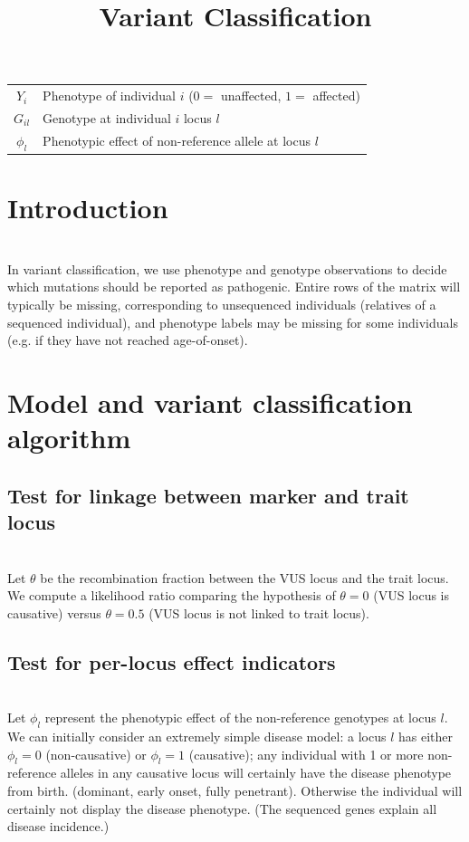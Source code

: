 \documentclass[11pt]{article}
\title{Variant Classification}
\newcommand{\p}{~\\}
\begin{document}
\maketitle

\begin{center}
  \begin{tabular}{c|l}
    $Y_i$     & Phenotype of individual $i$ ($0=$ unaffected, $1=$ affected)\\
    $G_{il}$   & Genotype at individual $i$ locus $l$\\
    $\phi_l$  & Phenotypic effect of non-reference allele at locus $l$\\
  \end{tabular}
\end{center}

\section{Introduction}

\p In variant classification, we use phenotype and genotype
observations to decide which mutations should be reported as
pathogenic. Entire rows of
the matrix will typically be missing, corresponding to unsequenced
individuals (relatives of a sequenced individual), and phenotype
labels may be missing for some individuals (e.g. if they have not
reached age-of-onset).


\section{Model and variant classification algorithm}

\subsection{Test for linkage between marker and trait locus}

\p Let $\theta$ be the recombination fraction between the VUS locus
and the trait locus. We compute a likelihood ratio comparing the
hypothesis of $\theta=0$ (VUS locus is causative) versus $\theta=0.5$
(VUS locus is not linked to trait locus).

\subsection{Test for per-locus effect indicators}

\p Let $\phi_l$ represent the phenotypic effect of the non-reference
genotypes at locus $l$. We can initially consider an extremely simple
disease model: a locus $l$ has either $\phi_l=0$ (non-causative) or
$\phi_l=1$ (causative); any individual with 1 or more non-reference
alleles in any causative locus will certainly have the disease
phenotype from birth. (dominant, early onset, fully
penetrant). Otherwise the individual will certainly not display the
disease phenotype. (The sequenced genes explain all disease
incidence.)
\end{document}
